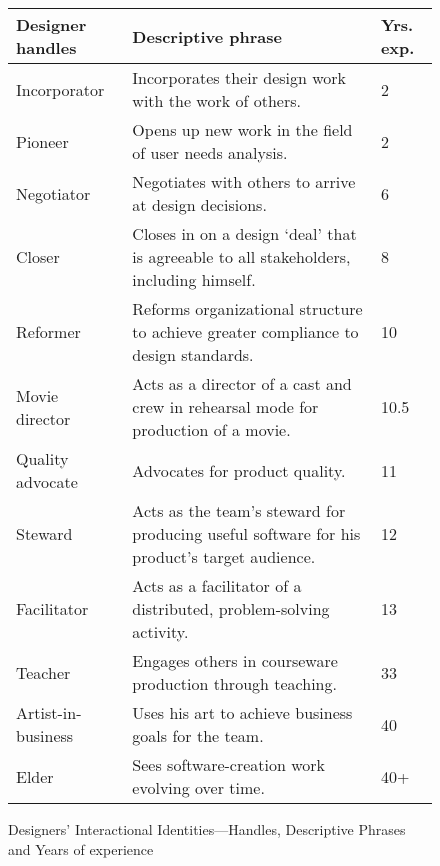 \documentclass{chi2009}
\begin{document}

\begin{figure}[bt]
\begin{tabular}{p{2.5cm}|p{4.3cm}|p{.6cm}}Designer handles	& Descriptive phrase & Yrs. exp. \\
\hline
Incorporator & Incorporates their design work with the work of others. & 2\\
Pioneer	& Opens up new work in the field of user needs analysis. & 2\\
Negotiator	& Negotiates with others to arrive at design decisions.  & 6\\
Closer	& Closes in on a design ‘deal’ that is agreeable to all stakeholders, including himself.  & 8\\
Reformer	& Reforms organizational structure to achieve greater compliance to design standards.  & 10\\
Movie director & 	Acts as a director of a cast and crew in rehearsal mode for production of a movie.  & 10.5\\
Quality advocate	& Advocates for product quality.  & 11\\
Steward	& Acts as the team’s steward for producing useful software for his product’s target audience.  & 12\\
Facilitator & 	Acts as a facilitator of a distributed, problem-solving activity.  & 13\\
Teacher	& Engages others in courseware production through teaching.  & 33\\
Artist-in-business & 	Uses his art to achieve business goals for the team.  & 40\\
Elder & 	Sees software-creation work evolving over time.  & 40+\\
\end {tabular}
\caption{Designers' Interactional Identities---Handles, Descriptive Phrases and Years of experience}
\label{table_1}
\end{figure}
 
\end{document}
